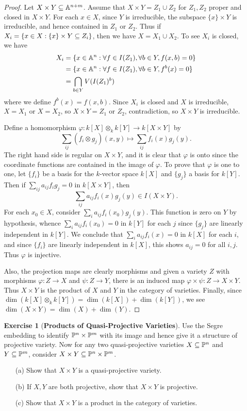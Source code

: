 \documentclass[11pt]{book}
\theoremstyle{definition}
\newtheorem{exercise}{Exercise}[section]
\begin{document}
\begin{proof}
Let $X\times Y\sub\A^{n+m}$. Assume that $X\times Y=Z_1\cup Z_2$ for $Z_1,Z_2$ proper and closed in $X\times Y$. For each $x\in X$, since $Y$ is irreducible, the subspace $\{x\}\times Y$ is irreducible, and hence contained in $Z_1$ or $Z_2$. Thus if $X_i=\{x\in X:\{x\}\times Y\sub Z_i\}$, then we have $X=X_1\cup X_2$. To see $X_i$ is closed, we have
\begin{align*}
X_i&=\{x\in\A^n:\forall f\in I(Z_1),\forall b\in Y,f(x,b)=0\}\\
&=\{x\in\A^n:\forall f\in I(Z_1),\forall b\in Y,f^b(x)=0\}\\
&=\bigcap_{b\in Y}V(I(Z_1)^b)
\end{align*}
where we define $f^b(x)=f(x,b)$. Since $X_i$ is closed and $X$ is irreducible, $X=X_1$ or $X=X_2$, so $X\times Y=Z_1$ or $Z_2$, contradiction, so $X\times Y$ is irreducible.\par
Define a homomorphism $\varphi:k[X]\otimes_kk[Y]\to k[X\times Y]$ by
\[\sum_{ij}(f_i\otimes g_j)(x,y)\mapsto\sum_{ij}f_i(x)g_j(y).\]
The right hand side is regular on $X\times Y$, and it is clear that $\varphi$ is onto since the coordinate functions are contained in the image of $\varphi$. To prove that $\varphi$ is one to one, let $\{f_i\}$ be a basis for the $k$-vector space $k[X]$ and $\{g_j\}$ a basis for $k[Y]$. Then if $\sum_{ij}a_{ij}f_ig_j=0$ in $k[X\times Y]$, then
\[\sum_{ij}a_{ij}f_i(x)g_j(y)\in I(X\times Y).\]
For each $x_0\in X$, consider $\sum_{i}a_{ij}f_i(x_0)g_j(y)$. This function is zero on $Y$ by hypothesis, whence $\sum_ia_{ij}f_i(x_0)=0$ in $k[Y]$ for each $j$ since $\{g_j\}$ are linearly independent in $k[Y]$. We conclude that $\sum_ia_{ij}f_i(x)=0$ in $k[X]$ for each $i$, and since $\{f_i\}$ are linearly independent in $k[X]$, this shows $a_{ij}=0$ for all $i,j$. Thus $\varphi$ is injective.\par
Also, the projection maps are clearly morphisms and given a variety $Z$ with morphisms $\varphi:Z\to X$ and $\psi:Z\to Y$, there is an induced map $\varphi\times\psi:Z\to X\times Y$. Thus $X\times Y$ is the product of $X$ and $Y$ in the category of varieties. Finally, since $\dim(k[X]\otimes_kk[Y])=\dim(k[X])+\dim(k[Y])$, we see $\dim(X\times Y)=\dim(X)+\dim(Y)$.
\end{proof}
\begin{exercise}[\textbf{Products of Quasi-Projective Varieties}]
Use the Segre embedding to identify $\P^n\times\P^m$ with its image and hence give it a structure of projective variety. Now for any two quasi-projective varieties $X\sub\P^n$ and $Y\sub\P^m$, consider $X\times Y\sub\P^n\times\P^m$.
\begin{itemize}
\item[(a)] Show that $X\times Y$ is a quasi-projective variety.
\item[(b)] If $X,Y$ are both projective, show that $X\times Y$ is projective.
\item[(c)] Show that $X\times Y$ is a product in the category of varieties. 
\end{itemize}
\end{exercise}
\end{document}
